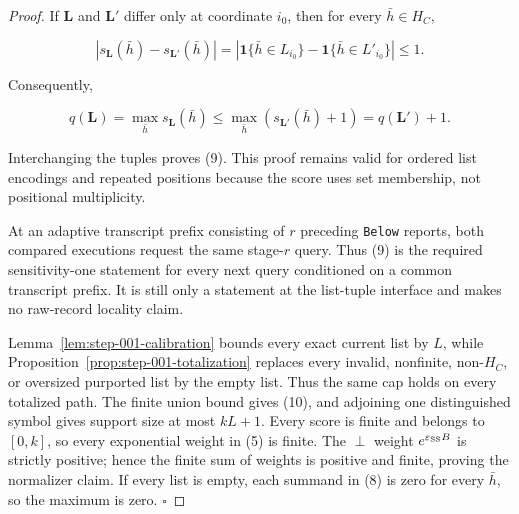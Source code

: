 \begin{proof}
If \(\mathbf L\) and \(\mathbf L'\) differ only at coordinate
\(i_0\), then for every \(\bar h\in H_C\),

\[
 |s_{\mathbf L}(\bar h)-s_{\mathbf L'}(\bar h)|
 =|\mathbf1\{\bar h\in L_{i_0}\}
   -\mathbf1\{\bar h\in L'_{i_0}\}|
 \leq1.
 \tag{11}
\]

Consequently,

\[
 q(\mathbf L)
 =\max_{\bar h}s_{\mathbf L}(\bar h)
 \leq\max_{\bar h}(s_{\mathbf L'}(\bar h)+1)
 =q(\mathbf L')+1.
\]

Interchanging the tuples proves (9). This proof remains valid for ordered
list encodings and repeated positions because the score uses set
membership, not positional multiplicity.

At an adaptive transcript prefix consisting of \(r\) preceding \texttt{Below}
reports, both compared executions request the same stage-\(r\) query. Thus
(9) is the required sensitivity-one statement for every next query
conditioned on a common transcript prefix. It is still only a statement at
the list-tuple interface and makes no raw-record locality claim.

Lemma~\ref{lem:step-001-calibration} bounds every exact current
list by \(L\), while Proposition~\ref{prop:step-001-totalization} replaces every invalid,
nonfinite, non-\(H_C\), or oversized purported list by the empty list. Thus
the same cap holds on every totalized path. The finite union bound gives
(10), and adjoining one distinguished symbol gives support size at most
\(kL+1\). Every score is finite and belongs to \([0,k]\), so every
exponential weight in (5) is finite. The \(\perp\) weight
\(e^{\varepsilon_{\rm SS}B}\) is strictly positive; hence the finite sum of
weights is positive and finite, proving the normalizer claim. If every
list is empty, each summand in (8) is zero for every \(\bar h\), so the
maximum is zero. \(\square\)


\end{proof}

